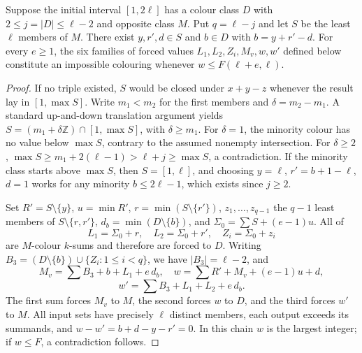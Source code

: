 \begin{lemma}\label{lem:T1-fill}
Suppose the initial interval $[1,2\ell]$ has a colour class $D$
with $2\le j=|D|\le\ell-2$ and opposite class $M$.
Put $q=\ell-j$ and let $S$ be the least $\ell$ members of $M$.
There exist $y,r',d\in S$ and $b\in D$ with $b=y+r'-d$.
For every $e\ge1$, the six families of forced values $L_1,L_2,Z_i,M_v,w,w'$ defined below constitute
an impossible colouring whenever $w\le F(\ell+e,\ell)$.
\end{lemma}
\begin{proof}
If no triple existed, $S$ would be closed under $x+y-z$ whenever
the result lay in $[1,\max S]$. Write $m_1<m_2$ for the first
members and $\delta=m_2-m_1$. A standard up-and-down translation
argument yields $S=(m_1+\delta\mathbb Z)\cap[1,\max S]$,
with $\delta\ge m_1$. For $\delta=1$, the minority colour has no
value below $\max S$, contrary to the assumed nonempty intersection.
For $\delta\ge2$,
$\max S\ge m_1+2(\ell-1)>\ell+j\ge\max S$, a contradiction.
If the minority class starts above $\max S$, then $S=[1,\ell]$,
and choosing $y=\ell$, $r'=b+1-\ell$, $d=1$ works for any
minority $b\le2\ell-1$, which exists since $j\ge2$.

Set $R'=S\setminus\{y\}$, $u=\min R'$,
$r=\min(S\setminus\{r'\})$,
$z_1,\ldots,z_{q-1}$ the $q-1$ least members of
$S\setminus\{r,r'\}$, $d_b=\min(D\setminus\{b\})$,
and $\Sigma_0=\sum S+(e-1)u$. All of
\[
 L_1=\Sigma_0+r,\quad L_2=\Sigma_0+r',\quad
 Z_i=\Sigma_0+z_i
\]
are $M$-colour $k$-sums and therefore are forced to $D$.
Writing $B_3=(D\setminus\{b\})\cup\{Z_i:1\le i<q\}$,
we have $|B_3|=\ell-2$, and
\[
 M_v=\sum B_3+b+L_1+e\,d_b,
\quad w=\sum R'+M_v+(e-1)u+d,
\]
\[
 w'=\sum B_3+L_1+L_2+e\,d_b.
\]
The first sum forces $M_v$ to $M$, the second forces $w$ to $D$,
and the third forces $w'$ to $M$. All input sets have precisely
$\ell$ distinct members, each output exceeds its summands, and
$w-w'=b+d-y-r'=0$. In this chain $w$ is the largest integer;
if $w\le F$, a contradiction follows.
\end{proof}

